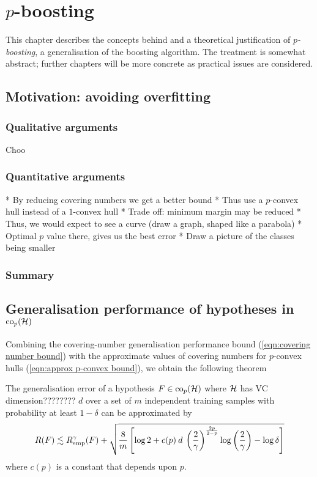 
\chapter{$p$-boosting}
\label{chapter:pboosting}

This chapter describes the concepts behind and a theoretical
justification of \emph{$p$-boosting}, a generalisation of the boosting
algorithm.  The treatment is somewhat abstract; further chapters will
be more concrete as practical issues are considered.

\section{Motivation: avoiding overfitting}



\subsection{Qualitative arguments}

Choo

\subsection{Quantitative arguments}
* By reducing covering numbers we get a better bound
* Thus use a $p$-convex hull instead of a $1$-convex hull
* Trade off: minimum margin may be reduced
* Thus, we would expect to see a curve (draw a graph, shaped like a parabola)
* Optimal $p$ value there, gives us the best error
* Draw a picture of the classes being smaller

\subsection{Summary}

\section{Generalisation performance of hypotheses in $\mathrm{co}_p(\mathcal{H})$}

Combining the covering-number generalisation performance bound
(\ref{eqn:covering number bound}) with the approximate values of
covering numbers for $p$-convex hulls (\ref{eqn:approx p-convex
bound}), we obtain the following theorem

\begin{theorem}
The generalisation error of a hypothesis $F \in \mathrm{co}_p(\mathcal{H})$ where
$\mathcal{H}$ has VC dimension???????? $d$ over a set of $m$ independent training
samples with probability at least $1 - \delta$ can be approximated by
%
\begin{equation}
R(F) \lesssim R_{\mathrm{emp}}^{\gamma}(F) + \sqrt{ \frac{8}{m} \left[ \log 2
+ c(p) \: d \: \left( \frac{2}{\gamma} \right)^{\frac{2p}{2-p}} \log
\left( \frac{2}{\gamma} \right) - \log \delta \right]}
\end{equation}
where $c(p)$ is a constant that depends upon $p$. 
%
\end{theorem}

